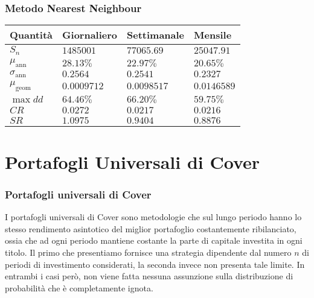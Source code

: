 \documentclass{beamer}
\theoremstyle{plain}
\theoremstyle{definition}
\theoremstyle{remark}
\begin{document}
\begin{frame}
\frametitle{Metodo Nearest Neighbour}
\begin{table}[H]
	\centering
	\begin{tabular}{|l|l|l|l|}
		\hline
		Quantità 			  & Giornaliero	 & Settimanale 	& Mensile		\\\hline
		$S_n$                 & $1485001 $   & $77065.69$	& $25047.91$ 	\\
		$\mu_{\text{ann}}$    & $28.13\%$    & $22.97\%$	& $20.65\%$		\\
		$\sigma_{\text{ann}}$ & $0.2564$     & $0.2541$		& $0.2327$		\\
		$\mu_{\text{geom}}$   & $0.0009712$  & $0.0098517$	& $0.0146589$	\\
		$\max dd$             & $64.46\%$    & $66.20\%$	& $59.75\%$		\\
		$CR$                  & $0.0272$     & $0.0217$		& $0.0216$		\\
		$SR$                  & $1.0975$     & $0.9404$		& $0.8876$		\\\hline
	\end{tabular}
\end{table}
\end{frame}

\section{Portafogli Universali di Cover}

\begin{frame}
	\frametitle{Portafogli universali di Cover}
	I portafogli universali di Cover sono metodologie che sul lungo periodo hanno lo stesso rendimento asintotico del miglior portafoglio costantemente ribilanciato, ossia che ad ogni periodo mantiene costante la parte di capitale investita in ogni titolo.\newline
	Il primo che presentiamo fornisce una strategia dipendente dal numero $n$ di periodi di investimento considerati, la seconda invece non presenta tale limite. In entrambi i casi però, non viene fatta nessuna assunzione sulla distribuzione di probabilità che è completamente ignota.
\end{frame}
\end{document}
